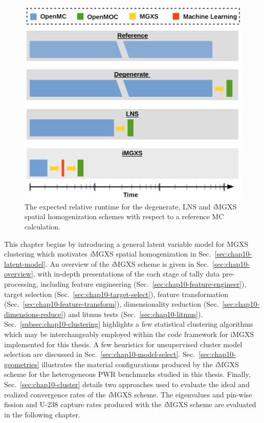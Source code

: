 \begin{figure}[h!]
\centering
\includegraphics[width=\linewidth]{figures/unsupervised/flow-chart}
\vspace{2mm}
\caption[Expected relative runtime for different homogenization schemes]{The expected relative runtime for the degenerate, \ac{LNS} and \textit{i}\ac{MGXS} spatial homogenization schemes with respect to a reference \ac{MC} calculation.}
\label{fig:chap10-flow-chart}
\end{figure}

This chapter begins by introducing a general latent variable model for \ac{MGXS} clustering which motivates \textit{i}\ac{MGXS} spatial homogenization in Sec.~\ref{sec:chap10-latent-model}. An overview of the \textit{i}\ac{MGXS} scheme is given in Sec.~\ref{sec:chap10-overview}, with in-depth presentations of the each stage of tally data pre-processing, including feature engineering (Sec.~\ref{sec:chap10-feature-engineer}), target selection (Sec.~\ref{sec:chap10-target-select}), feature transformation (Sec.~\ref{sec:chap10-feature-transform}), dimensionality reduction (Sec.~\ref{sec:chap10-dimensions-reduce}) and litmus tests (Sec.~\ref{sec:chap10-litmus}). Sec.~\ref{subsec:chap10-clustering} highlights a few statistical clustering algorithms which may be interchangeably employed within the code framework for i\ac{MGXS} implemented for this thesis. A few heuristics for unsupervised cluster model selection are discussed in Sec.~\ref{sec:chap10-model-select}. Sec.~\ref{sec:chap10-geometries} illustrates the material configurations produced by the \textit{i}\ac{MGXS} scheme for the heterogeneous \ac{PWR} benchmarks studied in this thesis. Finally, Sec.~\ref{sec:chap10-cluster} details two approaches used to evaluate the ideal and realized convergence rates of the \textit{i}\ac{MGXS} scheme. The eigenvalues and pin-wise fission and U-238 capture rates produced with the \textit{i}\ac{MGXS} scheme are evaluated in the following chapter.
  

